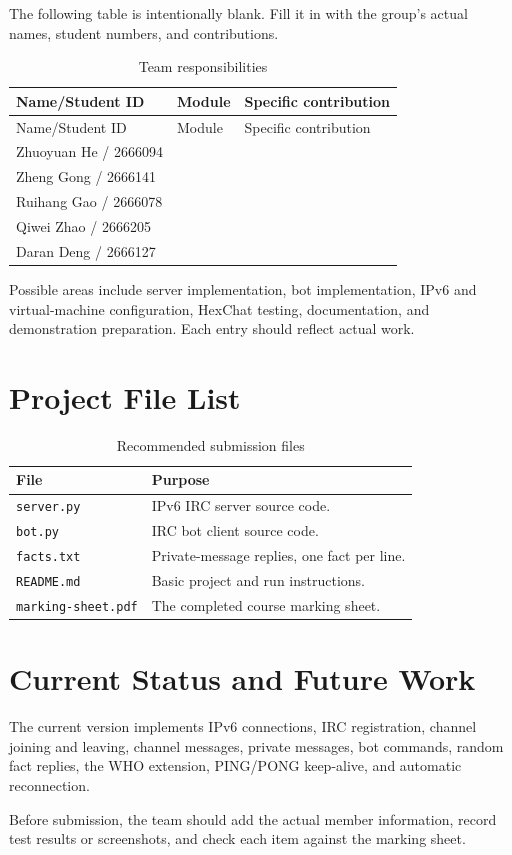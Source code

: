 \documentclass[a4paper,12pt]{article}
\begin{document}
The following table is intentionally blank. Fill it in with the group's actual names, student numbers, and contributions.

\begin{longtable}{p{5.3cm}p{3cm}p{5.3cm}}
\caption{Team responsibilities}
\label{tab:team}\\
\toprule
Name/Student ID & Module & Specific contribution \\
\midrule
\endfirsthead

\toprule
Name/Student ID & Module & Specific contribution \\
\midrule
\endhead

Zhuoyuan He / 2666094 & & \\
Zheng Gong / 2666141 & & \\
Ruihang Gao / 2666078 & & \\
Qiwei Zhao / 2666205 & & \\
Daran Deng / 2666127 & & \\

\bottomrule
\end{longtable}

Possible areas include server implementation, bot implementation, IPv6 and virtual-machine configuration, HexChat testing, documentation, and demonstration preparation. Each entry should reflect actual work.

\section{Project File List}

\begin{table}[htbp]
\centering
\begin{tabular}{p{4cm}p{8cm}}
\toprule
File & Purpose \\
\midrule
\texttt{server.py} & IPv6 IRC server source code. \\
\texttt{bot.py} & IRC bot client source code. \\
\texttt{facts.txt} & Private-message replies, one fact per line. \\
\texttt{README.md} & Basic project and run instructions. \\
\texttt{marking-sheet.pdf} & The completed course marking sheet. \\
\bottomrule
\end{tabular}
\caption{Recommended submission files}
\end{table}

\section{Current Status and Future Work}

The current version implements IPv6 connections, IRC registration, channel joining and leaving, channel messages, private messages, bot commands, random fact replies, the WHO extension, PING/PONG keep-alive, and automatic reconnection.

Before submission, the team should add the actual member information, record test results or screenshots, and check each item against the marking sheet.
\end{document}
